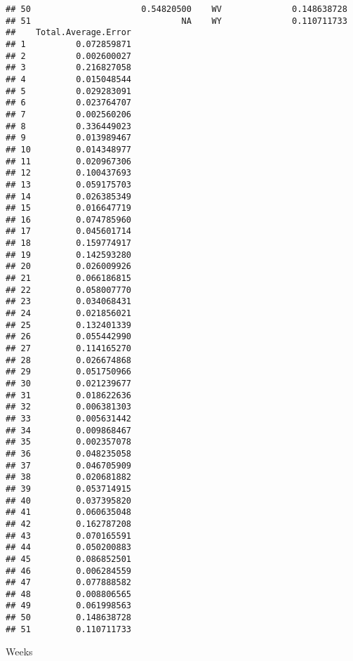 \documentclass{article}\usepackage[]{graphicx}\usepackage[]{color}
\makeatletter
\newenvironment{kframe}{%
 \def\at@end@of@kframe{}%
 \ifinner\ifhmode%
  \def\at@end@of@kframe{\end{minipage}}%
  \begin{minipage}{\columnwidth}%
 \fi\fi%
 \def\FrameCommand##1{\hskip\@totalleftmargin \hskip-\fboxsep
 \colorbox{shadecolor}{##1}\hskip-\fboxsep
     \hskip-\linewidth \hskip-\@totalleftmargin \hskip\columnwidth}%
 \MakeFramed {\advance\hsize-\width
   \@totalleftmargin\z@ \linewidth\hsize
   \@setminipage}}%
 {\par\unskip\endMakeFramed%
 \at@end@of@kframe}
\newenvironment{knitrout}{}{} %
\makeatother
\begin{document}
\begin{knitrout}
\begin{kframe}
\begin{verbatim}
## 50                      0.54820500    WV              0.148638728
## 51                              NA    WY              0.110711733
##    Total.Average.Error
## 1          0.072859871
## 2          0.002600027
## 3          0.216827058
## 4          0.015048544
## 5          0.029283091
## 6          0.023764707
## 7          0.002560206
## 8          0.336449023
## 9          0.013989467
## 10         0.014348977
## 11         0.020967306
## 12         0.100437693
## 13         0.059175703
## 14         0.026385349
## 15         0.016647719
## 16         0.074785960
## 17         0.045601714
## 18         0.159774917
## 19         0.142593280
## 20         0.026009926
## 21         0.066186815
## 22         0.058007770
## 23         0.034068431
## 24         0.021856021
## 25         0.132401339
## 26         0.055442990
## 27         0.114165270
## 28         0.026674868
## 29         0.051750966
## 30         0.021239677
## 31         0.018622636
## 32         0.006381303
## 33         0.005631442
## 34         0.009868467
## 35         0.002357078
## 36         0.048235058
## 37         0.046705909
## 38         0.020681882
## 39         0.053714915
## 40         0.037395820
## 41         0.060635048
## 42         0.162787208
## 43         0.070165591
## 44         0.050200883
## 45         0.086852501
## 46         0.006284559
## 47         0.077888582
## 48         0.008806565
## 49         0.061998563
## 50         0.148638728
## 51         0.110711733
\end{verbatim}
\end{kframe}
\end{knitrout}
11 Weeks
\end{document}
